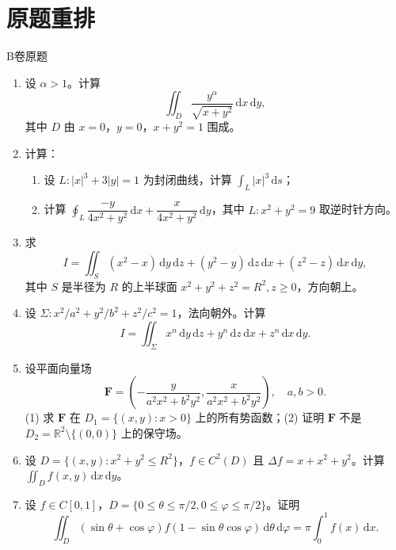 \documentclass[UTF8,zihao=-4,openany]{ctexbook}
\newcommand{\R}{\mathbb{R}}
\newcommand{\dd}{\,\mathrm{d}}
\begin{document}
\section*{原题重排}
\begin{problem}{B卷原题}
\begin{enumerate}[label=\textbf{B\arabic*.}]
\item 设 $\alpha>1$。计算
\[
\iint_D\frac{y^\alpha}{\sqrt{x+y^2}}\dd x\dd y,
\]
其中 $D$ 由 $x=0$，$y=0$，$x+y^2=1$ 围成。
\item 计算：
\begin{enumerate}[label=(\arabic*)]
\item 设 $L:|x|^3+3|y|=1$ 为封闭曲线，计算 $\int_L|x|^3\dd s$；
\item 计算 $\oint_L\dfrac{-y}{4x^2+y^2}\dd x+\dfrac{x}{4x^2+y^2}\dd y$，其中 $L:x^2+y^2=9$ 取逆时针方向。
\end{enumerate}
\item 求
\[
I=\iint_S(x^2-x)\dd y\dd z+(y^2-y)\dd z\dd x+(z^2-z)\dd x\dd y,
\]
其中 $S$ 是半径为 $R$ 的上半球面 $x^2+y^2+z^2=R^2,z\ge0$，方向朝上。
\item 设 $\Sigma:x^2/a^2+y^2/b^2+z^2/c^2=1$，法向朝外。计算
\[
I=\iint_\Sigma x^n\dd y\dd z+y^n\dd z\dd x+z^n\dd x\dd y.
\]
\item 设平面向量场
\[
\bm F=\left(-\frac{y}{a^2x^2+b^2y^2},\frac{x}{a^2x^2+b^2y^2}\right),\quad a,b>0.
\]
(1) 求 $\bm F$ 在 $D_1=\{(x,y):x>0\}$ 上的所有势函数；(2) 证明 $\bm F$ 不是 $D_2=\R^2\setminus\{(0,0)\}$ 上的保守场。
\item 设 $D=\{(x,y):x^2+y^2\le R^2\}$，$f\in C^2(D)$ 且 $\Delta f=x+x^2+y^2$。计算 $\iint_Df(x,y)\dd x\dd y$。
\item 设 $f\in C[0,1]$，$D=\{0\le\theta\le\pi/2,0\le\varphi\le\pi/2\}$。证明
\[
\iint_D(\sin\theta+\cos\varphi)f(1-\sin\theta\cos\varphi)\dd\theta\dd\varphi
=\pi\int_0^1f(x)\dd x.
\]
\end{enumerate}
\end{problem}
\end{document}
